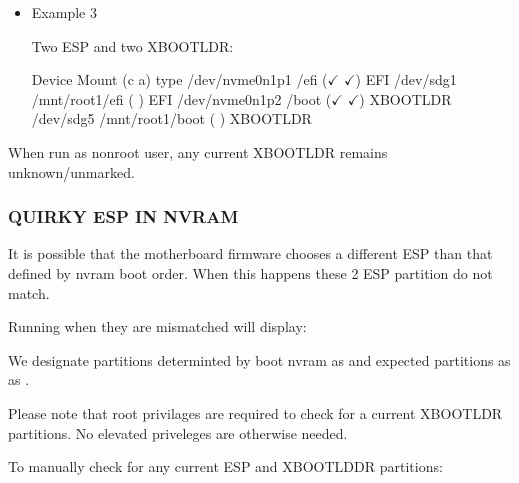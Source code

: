 \documentclass[letterpaper,11pt,english]{sphinxmanual}
\begin{document}
\begin{itemize}
\item {} 
\sphinxAtStartPar
Example 3

\sphinxAtStartPar
Two ESP and two XBOOTLDR:

\begin{sphinxVerbatim}[commandchars=\\\{\}]
        Device Mount                          (c a) type
/dev/nvme0n1p1 /efi                           (\(\pmb{\checkmark}\) \(\pmb{\checkmark}\)) EFI
     /dev/sdg1 /mnt/root1/efi                 (   ) EFI
/dev/nvme0n1p2 /boot                          (\(\pmb{\checkmark}\) \(\pmb{\checkmark}\)) XBOOTLDR
     /dev/sdg5 /mnt/root1/boot                (   ) XBOOTLDR
\end{sphinxVerbatim}

\end{itemize}

\sphinxAtStartPar
When run as non\sphinxhyphen{}root user, any current XBOOTLDR remains unknown/unmarked.


\subsubsection{QUIRKY ESP IN NVRAM}
\label{\detokenize{_build/man-ready/sd-boot-find-boot-mounts.8:quirky-esp-in-nvram}}
\sphinxAtStartPar
It is possible that the motherboard firmware chooses a different ESP than
that defined by nvram boot order. When this happens these 2 ESP partition
do not match.

\sphinxAtStartPar
Running  when they are mismatched will display:

\begin{sphinxVerbatim}[commandchars=\\\{\}]
            
\end{sphinxVerbatim}

\sphinxAtStartPar
We designate partitions determinted by boot nvram as  and expected partitions as
as .

\sphinxAtStartPar
Please note that root privilages are required to check for a current XBOOTLDR partitions.
No elevated priveleges are otherwise needed.

\sphinxAtStartPar
To manually check for any current ESP and XBOOTLDDR partitions:
\end{document}
